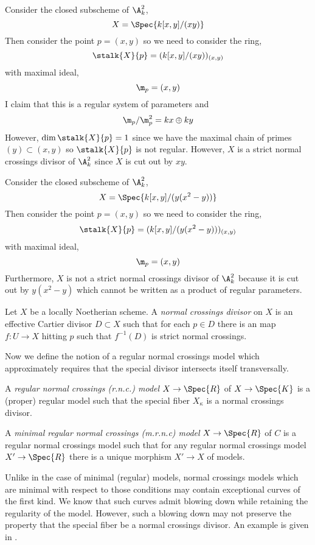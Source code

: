 \begin{example}
Consider the closed subscheme of $\A^2_k$,
\[ X = \Spec{k[x, y]/(xy)} \]
Then consider the point $p = (x, y)$ so we need to consider the ring,
\[ \stalk{X}{p} = (k[x, y]/(xy))_{(x, y)} \]
with maximal ideal,
\[ \m_p = (x, y) \]
I claim that this is a regular system of parameters and
\[ \m_p / \m_p^2 = k x \oplus k y \] 
However, $\dim{\stalk{X}{p}} = 1$ since we have the maximal chain of primes $(y) \subset (x, y)$ so $\stalk{X}{p}$ is not regular. However, $X$ is a strict normal crossings divisor of $\A^2_k$ since $X$ is cut out by $xy$. 
\end{example}

\begin{example}
Consider the closed subscheme of $\A^2_k$,
\[ X = \Spec{k[x, y]/(y(x^2 - y))} \]
Then consider the point $p = (x, y)$ so we need to consider the ring,
\[ \stalk{X}{p} = (k[x, y]/(y(x^2 - y)))_{(x, y)} \]
with maximal ideal,
\[ \m_p = (x, y) \]
Furthermore, $X$ is not a strict normal crossings divisor of $\A^2_k$ because it is cut out by $y (x^2 - y)$ which cannot be written as a product of regular parameters. 
\end{example}

\begin{defn}
Let $X$ be a locally Noetherian scheme. A \textit{normal crossings divisor} on $X$ is an effective Cartier divisor $D \subset X$ such that for each $p \in D$ there is an \etale map $f : U \to X$ hitting $p$ such that $f^{-1}(D)$ is strict normal crossings.
\end{defn}
\noindent
Now we define the notion of a regular normal crossings model which approximately requires that the special divisor intersects itself transversally. 

\begin{defn}
A \textit{regular normal crossings (r.n.c.) model} $X \to \Spec{R}$ of $X \to \Spec{K}$ is a (proper) regular model such that the special fiber $X_\kappa$ is a normal crossings divisor.
\end{defn}

\begin{defn}
A \textit{minimal regular normal crossings (m.r.n.c) model} $X \to \Spec{R}$ of $C$ is a regular normal crossings model such that for any regular normal crossings model $X' \to \Spec{R}$ there is a unique morphism $X' \to X$ of models.
\end{defn}

\begin{rmk}
Unlike in the case of minimal (regular) models, normal crossings models which are minimal with respect to those conditions may contain exceptional curves of the first kind. We know that such curves admit blowing down while retaining the regularity of the model. However, such a blowing down may not preserve the property that the special fiber be a normal crossings divisor. An example is given in \cite[Rmk. 3.16]{tim}.
\end{rmk}

